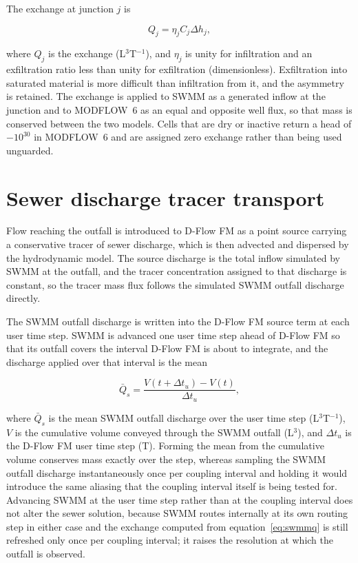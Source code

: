 \documentclass[preprint,authoryear,11pt]{elsarticle}
\begin{document}
The exchange at junction $j$ is

\begin{equation}
  Q_{j} = \eta_{j} C_{j} \Delta h_{j} ,
  \label{eq:swmmq}
\end{equation}

\noindent where $Q_{j}$ is the exchange (L$^{3}$T$^{-1}$), and $\eta_{j}$ is unity for infiltration and an exfiltration ratio less than unity for exfiltration (dimensionless). Exfiltration into saturated material is more difficult than infiltration from it, and the asymmetry is retained. The exchange is applied to SWMM as a generated inflow at the junction and to MODFLOW~6 as an equal and opposite well flux, so that mass is conserved between the two models. Cells that are dry or inactive return a head of $-10^{30}$ in MODFLOW~6 and are assigned zero exchange rather than being used unguarded.

\section{Sewer discharge tracer transport}

Flow reaching the outfall is introduced to D-Flow FM as a point source carrying a conservative tracer of sewer discharge, which is then advected and dispersed by the hydrodynamic model. The source discharge is the total inflow simulated by SWMM at the outfall, and the tracer concentration assigned to that discharge is constant, so the tracer mass flux follows the simulated SWMM outfall discharge directly.

The SWMM outfall discharge is written into the D-Flow FM source term at each user time step. SWMM is advanced one user time step ahead of D-Flow FM so that its outfall covers the interval D-Flow FM is about to integrate, and the discharge applied over that interval is the mean

\begin{equation}
  \bar{Q}_{s} = \frac{V\!\left(t + \Delta t_{u}\right) - V\!\left(t\right)}
                     {\Delta t_{u}} ,
  \label{eq:blockmean}
\end{equation}

\noindent where $\bar{Q}_{s}$ is the mean SWMM outfall discharge over the user time step (L$^{3}$T$^{-1}$), $V$ is the cumulative volume conveyed through the SWMM outfall (L$^{3}$), and $\Delta t_{u}$ is the D-Flow FM user time step (T). Forming the mean from the cumulative volume conserves mass exactly over the step, whereas sampling the SWMM outfall discharge instantaneously once per coupling interval and holding it would introduce the same aliasing that the coupling interval itself is being tested for. Advancing SWMM at the user time step rather than at the coupling interval does not alter the sewer solution, because SWMM routes internally at its own routing step in either case and the exchange computed from equation~\ref{eq:swmmq} is still refreshed only once per coupling interval; it raises the resolution at which the outfall is observed.
\end{document}
